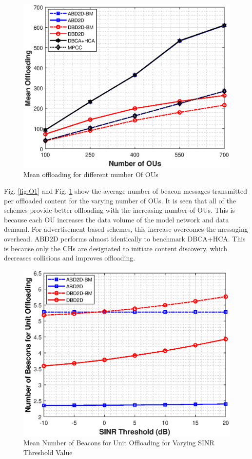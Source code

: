 \documentclass[10pt,a4paper,twocolumn]{article}
\begin{document}
\begin{figure}[!htb]
	\centering
	
	\includegraphics[width=\columnwidth]{OU2.eps}
	\caption{Mean offloading for different number Of OUs}
	\label{fig:O2}
\end{figure}

Fig. \ref{fig:O1} and Fig. \ref{fig:O2} show the average number of beacon messages transmitted per offloaded content for the varying number of OUs.  It is seen that all of the schemes provide better offloading with the increasing number of OUs. This is because each OU increases the data volume of the model network and data demand. For advertisement-based schemes, this increase overcomes the messaging overhead. ABD2D performs almost identically to benchmark DBCA+HCA. This is because only the CHs are designated to initiate content discovery, which decreases collisions and improves offloading. 

\begin{figure}[!htb]
	\centering
	\includegraphics[width=\columnwidth]{SINR1.eps}
	\caption{Mean Number of Beacons for Unit Offloading for Varying SINR Threshold Value}
	\label{fig:SINR1}
\end{figure}
\end{document}
